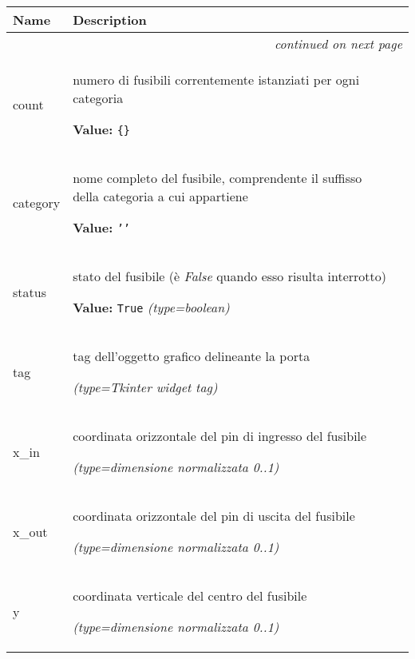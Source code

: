     \vspace{-1cm}
\hspace{\varindent}\begin{longtable}{|p{\varnamewidth}|p{\vardescrwidth}|l}
\cline{1-2}
\cline{1-2} \centering \textbf{Name} & \centering \textbf{Description}& \\
\cline{1-2}
\endhead\cline{1-2}\multicolumn{3}{r}{\small\textit{continued on next page}}\\\endfoot\cline{1-2}
\endlastfoot\raggedright c\-o\-u\-n\-t\- & \raggedright numero di fusibili correntemente istanziati per ogni categoria

\textbf{Value:} 
{\tt \texttt{\{}\texttt{\}}}&\\
\cline{1-2}
\raggedright c\-a\-t\-e\-g\-o\-r\-y\- & \raggedright nome completo del fusibile, comprendente il suffisso della 
          categoria a cui appartiene

\textbf{Value:} 
{\tt \texttt{'}\texttt{}\texttt{'}}&\\
\cline{1-2}
\raggedright s\-t\-a\-t\-u\-s\- & \raggedright stato del fusibile (è \textit{False} quando esso risulta 
          interrotto)

\textbf{Value:} 
{\tt True}            {\it (type=boolean)}&\\
\cline{1-2}
\raggedright t\-a\-g\- & \raggedright tag dell'oggetto grafico delineante la porta

            {\it (type=Tkinter widget tag)}&\\
\cline{1-2}
\raggedright x\-\_\-i\-n\- & \raggedright coordinata orizzontale del pin di ingresso del fusibile

            {\it (type=dimensione normalizzata 0..1)}&\\
\cline{1-2}
\raggedright x\-\_\-o\-u\-t\- & \raggedright coordinata orizzontale del pin di uscita del fusibile

            {\it (type=dimensione normalizzata 0..1)}&\\
\cline{1-2}
\raggedright y\- & \raggedright coordinata verticale del centro del fusibile

            {\it (type=dimensione normalizzata 0..1)}&\\
\cline{1-2}
\end{longtable}




